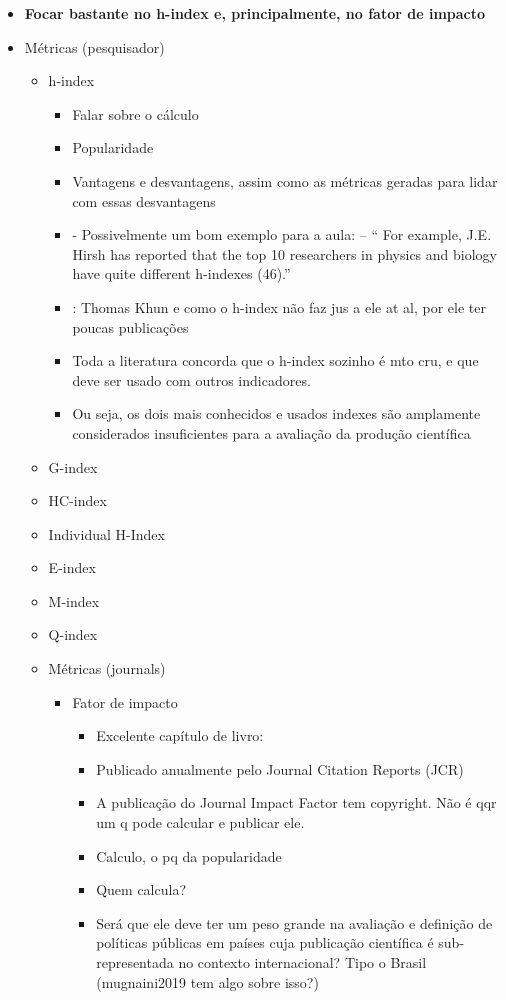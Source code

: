 \documentclass[11pt]{article}
\begin{document}
\begin{itemize}
\item \textbf{Focar bastante no h-index e, principalmente, no fator de impacto}
\item Métricas (pesquisador)
\begin{itemize}
\item h-index
\begin{itemize}
\item Falar sobre o cálculo
\item Popularidade
\item Vantagens e desvantagens, assim como as métricas geradas para lidar com essas desvantagens
\item \cite{durieux2010} - Possivelmente um bom exemplo para a aula: – “ For example, J.E. Hirsh has reported that the top 10 researchers in physics and biology have quite different h-indexes (46).”
\item \cite{mingers2015} :  Thomas Khun e como o h-index não faz jus a ele at al, por ele ter poucas publicações
\item Toda a literatura concorda que o h-index sozinho é mto cru, e que deve ser usado com outros indicadores.
\item Ou seja, os dois mais conhecidos e usados indexes são amplamente considerados insuficientes para a avaliação da produção científica \cite{mingers2015}
\end{itemize}
\item G-index
\item HC-index
\item Individual H-Index
\item E-index
\item M-index
\item Q-index
\item Métricas (journals)
\begin{itemize}
\item Fator de impacto
\begin{itemize}
\item Excelente capítulo de livro: \cite{vanraan2019}
\item Publicado anualmente pelo Journal Citation Reports (JCR)
\item A publicação do Journal Impact Factor tem copyright. Não é qqr um q pode calcular e publicar ele.
\item Calculo, o pq da popularidade
\item Quem calcula?
\item Será que ele deve ter um peso grande na avaliação e definição de políticas públicas em países cuja publicação científica é sub-representada no contexto internacional? Tipo o Brasil (mugnaini2019 tem algo sobre isso?)

\end{itemize}
\end{itemize}
\end{itemize}
\end{itemize}
\end{document}
